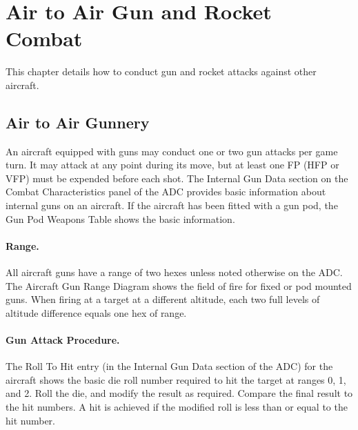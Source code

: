 \section{Air to Air Gun and Rocket Combat}

This chapter details how to conduct gun and rocket attacks against other aircraft.

\subsection{Air to Air Gunnery}

An aircraft equipped with guns may conduct one or two gun attacks per game turn. It may attack at any point during its move, but at least one FP (HFP or VFP) must be expended before each shot. The Internal Gun Data section on the Combat Characteristics panel of the ADC provides basic information about internal guns on an aircraft. If the aircraft has been fitted with a gun pod, the Gun Pod Weapons Table shows the basic information.

\paragraph{Range.} All aircraft guns have a range of two hexes unless noted otherwise on the ADC. The Aircraft Gun Range Diagram shows the field of fire for fixed or pod mounted guns. When firing at a target at a different altitude, each two full levels of altitude difference equals one hex of range.


\paragraph{Gun Attack Procedure.} The Roll To Hit entry (in the Internal Gun Data section of the ADC) for the aircraft shows the basic die roll number required to hit the target at ranges 0, 1, and 2. Roll the die, and modify the result as required. Compare the final result to the hit numbers. A hit is achieved if the modified roll is less than or equal to the hit number.

